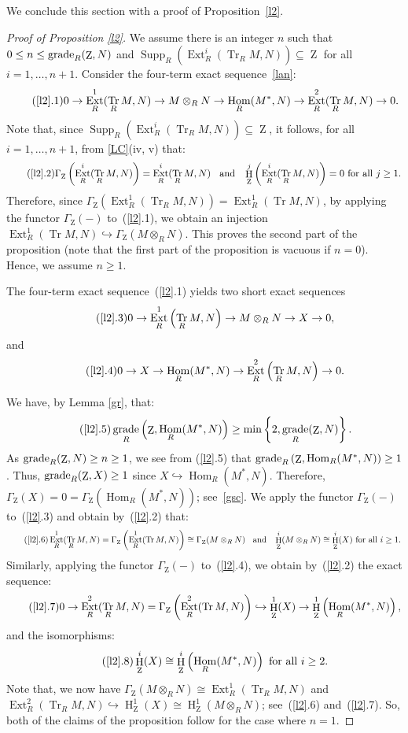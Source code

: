 \documentclass[11pt]{amsart}
\theoremstyle{definition}
\theoremstyle{definition}
\numberwithin{equation}{section}
\DeclareMathOperator{\gr}{\textnormal{grade}}
\DeclareMathOperator{\Tr}{Tr}
\DeclareMathOperator{\mz}{Z}
\DeclareMathOperator{\Ext}{Ext}
\DeclareMathOperator{\hh}{H}
\DeclareMathOperator{\Hom}{Hom}
\DeclareMathOperator{\Supp}{Supp}
\begin{document}
We conclude this section with a proof of Proposition~\ref{l2}.

\begin{proof}[Proof of Proposition \ref{l2}] We assume there is an integer $n$ such that $0\leq n\leq\gr_R(\mz,N)$ and $\Supp_R\left(\Ext^i_R(\Tr_R M,N)\right)\subseteq\mz$ for all $i=1, \ldots, n+1$. Consider the four-term exact sequence~\ref{lan}:
\[
\tag{\ref{l2}.1} 0\rightarrow\Ext^1_R(\Tr_R M,N)\rightarrow M\otimes_RN\rightarrow\Hom_R(M^*,N)\rightarrow\Ext^2_R(\Tr_R M,N)\rightarrow0.
\]
Note that, since $\Supp_R\left(\Ext^i_R(\Tr_R M,N)\right)\subseteq\mz$, it follows, for all $i=1, \ldots, n+1$, from \ref{LC}(iv, v) that:
\[
\tag{\ref{l2}.2} \Gamma_{\mz}\left(\Ext^i_R(\Tr_R M,N)\right)=\Ext^i_R(\Tr_R M,N) \;\;\text{ and }\;\;  \hh^j_{\mz}\left(\Ext^i_R(\Tr_R M,N)\right)=0 \text{ for all } j\geq 1.
\]
Therefore, since $\Gamma_{\mz}\left(\Ext^1_R(\Tr_R M,N)\right)=\Ext^1_R(\Tr M,N)$, by applying the functor $\Gamma_{\mz}(-)$ to~(\ref{l2}.1), we obtain an injection $\Ext^{1}_R(\Tr M,N)\hookrightarrow\Gamma_{\mz}(M\otimes_RN)$. This proves the second part of the proposition (note that the first part of the proposition is vacuous if $n=0$). Hence, we assume $n\geq 1$.

The four-term exact sequence~(\ref{l2}.1) yields two short exact sequences
\[
\tag{\ref{l2}.3} 0\rightarrow\Ext^1_R\left(\Tr_RM,N\right)\rightarrow M\otimes_RN\rightarrow X\rightarrow0,
\]
and
\[
\tag{\ref{l2}.4} 0\rightarrow X\rightarrow\Hom_R(M^*,N)\rightarrow\Ext^2_R\left(\Tr_RM,N\right)\rightarrow0.
\]

We have, by Lemma \ref{gr}, that: 
\[
\tag{\ref{l2}.5} \gr_R\left(\mz,\Hom_R(M^{\ast},N)\right) \geq \min \left\{2,\gr_R(\mz,N)\right\}.
\]
As $\gr_R(\mz,N)\geq n\geq 1$, we see from (\ref{l2}.5) that $\gr_R\left(\mz,\Hom_R(M^{\ast},N)\right) \geq 1$. Thus, $\gr_R(\mz,X)\geq 1$ since 
$X\hookrightarrow \Hom_R(M^*,N)$. Therefore, $\Gamma_{\mz}(X)=0=\Gamma_{\mz}\left(\Hom_R(M^{\ast},N)\right)$; see~\ref{gsc}. We  apply the functor $\Gamma_{\mz}(-)$ to~(\ref{l2}.3) and obtain by~(\ref{l2}.2) that:
\[
\tag{\ref{l2}.6} \Ext^1_R(\Tr_R M,N)=\Gamma_{\mz}\left(\Ext^1_R(\Tr M,N)\right) \cong \Gamma_{\mz}(M\otimes_RN) \;\;\text{ and }\;\; \hh^i_{\mz}(M\otimes_RN) \cong \hh^i_{\mz}(X) \text{ for all } i\geq 1.
\]
Similarly, applying the functor $\Gamma_{\mz}(-)$ to~(\ref{l2}.4), we obtain by~(\ref{l2}.2) the exact sequence:
\[
\tag{\ref{l2}.7} 0 \rightarrow \Ext^2_R(\Tr_R M,N)=\Gamma_{\mz}\left(\Ext^2_R(\Tr M,N)\right)\hookrightarrow\hh^1_{\mz}(X) \rightarrow \hh^1_{\mz}\left(\Hom_R(M^*,N)\right),   
\]
and the isomorphisms:
\[
\tag{\ref{l2}.8} \hh^{i}_{\mz}(X) \cong \hh^i_{\mz}\left(\Hom_R(M^*,N)\right)  \text{ for all } i\geq 2.
\]
Note that, we now have $\Gamma_{\mz}(M\otimes_RN) \cong \Ext^1_R(\Tr_R M,N)$ and $ \Ext^2_R(\Tr_R M,N) \hookrightarrow \hh^1_{\mz}(X) \cong \hh^1_{\mz}(M\otimes_RN)$; see~(\ref{l2}.6) and~(\ref{l2}.7). So, both of the claims of the proposition follow for the case where $n=1$.


\end{proof}
\end{document}
